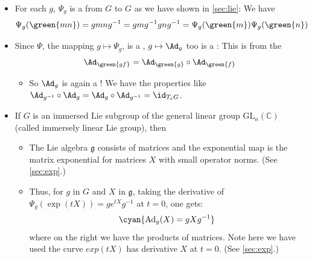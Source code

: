 \documentclass{article}
\newcommand{\cl}{:\text{ }}
\begin{document}
\begin{enumerate}
\begin{itemize}
\item For each $g$, $\Psi_g$ is a  from $G$ to $G$ as we have shown in \cref{sec:lie}:
 We have $$\Psi_g(\green{mn})=g  mng^{-1} = gmg^{-1}gng^{-1} = \Psi_g(\green{m})\Psi_g(\green{n})$$
\item  Since $\Psi$, the mapping  $g \mapsto \Psi_g$, is a , $g \mapsto \Ad_g$ too is a :
This is from the 
$$\Ad_{\green{gf}} =\Ad_\green{g} \circ \Ad_\green{f}
$$
\begin{itemize}[$\ast$]
    \item So $\Ad_g$ is again a ! We have the properties like $\Ad_{g^{-1}} \circ \Ad_{g} = \Ad_{g} \circ \Ad_{g^{-1}} = \id_{T_eG}$.
\end{itemize}
\item  If $G$ is an immersed Lie subgroup of the general linear group $\mathrm{GL}_n(\mathbb{C})$ (called immersely linear Lie group), then 
\begin{itemize}[$\ast$]
    \item The Lie algebra $\mathfrak{g}$ consists of matrices and the exponential map is the matrix exponential  for matrices $X$ with small operator norms. (See \cref{sec:exp}.)
    \item Thus, for $g$ in $G$ and $X$ in $\mathfrak{g}$, taking the derivative of $\Psi_g(\exp (t X))=g e^{t X} g^{-1}$ at $t=0$, one gets:
\begin{align*}
\cyan{\operatorname{Ad}_g(X)=g X g^{-1}}
\end{align*}
where on the right we have the products of matrices. Note here we have used the curve $exp (t X)$ has derivative $X$ at $t=0$. (See \cref{sec:exp}.)
\end{itemize} 

\end{itemize}
\end{enumerate}
\end{document}
